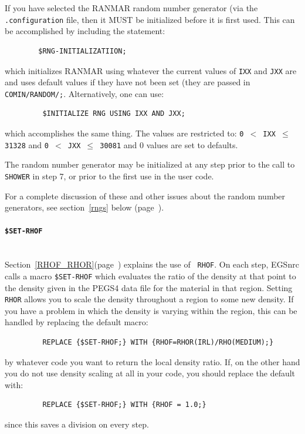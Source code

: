 If you have selected the RANMAR random number generator (via the {\tt
.configuration} file, then it MUST be initialized before it is first used.
This can be accomplished by including the statement:
\begin{verbatim}
        $RNG-INITIALIZATIION;
\end{verbatim}
which initializes RANMAR using whatever the current values of {\tt IXX} and
{\tt JXX} are and uses default values if they have not been set (they are
passed in {\tt COMIN/RANDOM/;}. Alternatively, one can use:
\begin{verbatim}
         $INITIALIZE RNG USING IXX AND JXX;
\end{verbatim}
which accomplishes the same thing. The values are restricted to:
{\tt 0 $<$ IXX $\le$ 31328} and {\tt 0 $<$ JXX $\le$ 30081} and 0 values
are set to defaults.

The random number generator may be initialized at any step prior to the
call to {\tt SHOWER} in step 7, or prior to the first use in the user code.

For a complete discussion of these and other issues about the random number
generators, see section~\ref{rngs} below (page~\pageref{rngs}).


\paragraph{{\tt \$SET-RHOF}}

\label{set_rhof}
\mbox{}\\
Section~\ref{RHOF_RHOR}(page~\pageref{RHOF_RHOR}) explains the use of {\tt
RHOF}.  On each step, EGSnrc calls a macro {\tt  \$SET-RHOF} which
evaluates the ratio of the density at that point to the density given in
the PEGS4 data file for the material in that region. Setting {\tt RHOR}
allows you to scale the density throughout a region to some new density. If
you have a problem in which the density is varying within the region, this
can be handled by replacing the default macro:
\begin{verbatim}
         REPLACE {$SET-RHOF;} WITH {RHOF=RHOR(IRL)/RHO(MEDIUM);}
\end{verbatim}
by whatever code you want to return the local density ratio. If, on the
other hand you do not use density scaling at all in your code, you should
replace the default with:
\begin{verbatim}
         REPLACE {$SET-RHOF;} WITH {RHOF = 1.0;}
\end{verbatim}
since this saves a division on every step.


